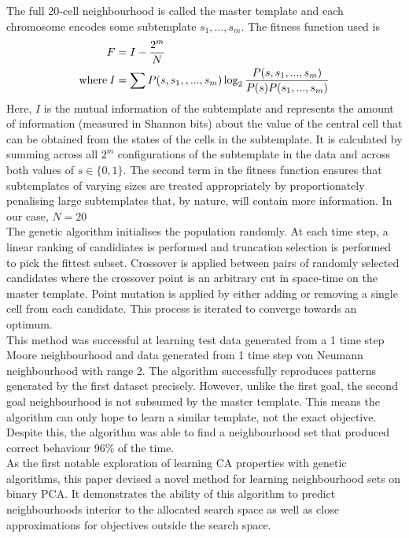 The full 20-cell neighbourhood is called the master template and each chromosome encodes some subtemplate ${s_1, ..., s_m}$. The fitness function used is
\begin{align*}
                    F &= I - \frac{2^m}{N}\\
    \text{where\:}  I &= \sum P(s, s_1,, ..., s_m)\log_2{\frac{P(s, s_1, ..., s_m)}{P(s)P(s_1, ..., s_m)}}
\end{align*}
Here, $I$ is the mutual information of the subtemplate and represents the amount of information (measured in Shannon bits) about the value of the central cell that can be obtained from the states of the cells in the subtemplate. It is calculated by summing across all $2^m$ configurations of the subtemplate in the data and across both values of $s \in \{0,1\}$. The second term in the fitness function ensures that subtemplates of varying sizes are treated appropriately by proportionately penalising large subtemplates that, by nature, will contain more information. In our case, $N=20$\\

The genetic algorithm initialises the population randomly. At each time step, a linear ranking of candidiates is performed and truncation selection is performed to pick the fittest subset. Crossover is applied between pairs of randomly selected candidates where the crossover point is an arbitrary cut in space-time on the master template. Point mutation is applied by either adding or removing a single cell from each candidate. This process is iterated to converge towards an optimum.\\

This method was successful at learning test data generated from a 1 time step Moore neighbourhood and data generated from 1 time step von Neumann neighbourhood with range 2. The algorithm successfully reproduces patterns generated by the first dataset precisely. However, unlike the first goal, the second goal neighbourhood is not subsumed by the master template. This means the algorithm can only hope to learn a similar template, not the exact objective. Despite this, the algorithm was able to find a neighbourhood set that produced correct behaviour 96\% of the time.\\

As the first notable exploration of learning CA properties with genetic algorithms, this paper devised a novel method for learning neighbourhood sets on binary PCA. It demonstrates the ability of this algorithm to predict neighbourhoods interior to the allocated search space as well as close approximations for objectives outside the search space.\\

